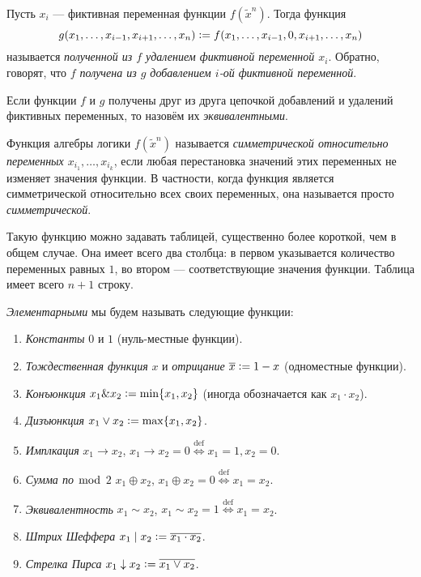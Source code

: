 \begin{definition}
    Пусть $x_i$ --- фиктивная переменная функции $f(\widetilde{x}^n)$. Тогда функция \[g(x_1, \ldots, x_{i - 1}, x_{i + 1}, \ldots, x_n) \vcentcolon = f(x_1, \ldots, x_{i - 1}, 0, x_{i + 1}, \ldots, x_n)\]
    называется \textit{полученной из $f$ удалением фиктивной переменной $x_i$}. Обратно, говорят, что \textit{$f$ получена из $g$ добавлением $i$-ой фиктивной переменной}.
\end{definition}

\begin{definition}
    Если функции $f$ и $g$ получены друг из друга цепочкой добавлений и удалений фиктивных переменных, то назовём их \textit{эквивалентными}.
\end{definition}

\begin{definition}
    Функция алгебры логики $f(\widetilde{x}^n)$ называется \textit{симметрической относительно переменных $x_{i_1}, \ldots, x_{i_k}$}, если любая перестановка значений этих переменных не изменяет значения функции. В частности, когда функция является симметрической относительно всех своих переменных, она называется просто \textit{симметрической}.
\end{definition}

Такую функцию можно задавать таблицей, существенно более короткой, чем в общем случае. Она имеет всего два столбца: в первом указывается количество переменных равных $1$, во втором --- соответствующие значения функции. Таблица имеет всего $n + 1$ строку.

\begin{definition}
    \textit{Элементарными} мы будем называть следующие функции:
    \begin{enumerate}[nolistsep]
        \item \textit{Константы} $0$ и $1$ (нуль-местные функции).
        \item \textit{Тождественная функция} $x$ и \textit{отрицание} $\overline{x} \vcentcolon = 1 - x$ (одноместные функции).
        \item \textit{Конъюнкция} $x_1 \& x_2 \vcentcolon = \min\{x_1, x_2\}$ (иногда обозначается как $x_1 \cdot x_2$).
        \item \textit{Дизъюнкция} $x_1 \vee x_2 \vcentcolon = \max\{x_1, x_2\}$.
        \item \textit{Имплкация} $x_1 \to x_2$, $x_1 \to x_2 = 0 \overset{\mathrm{def}}{\Longleftrightarrow} x_1 = 1, x_2 = 0$.
        \item \textit{Сумма по $\bmod$ $2$} $x_1 \oplus x_2$, $x_1 \oplus x_2 = 0 \overset{\mathrm{def}}{\Longleftrightarrow} x_1 = x_2$.
        \item \textit{Эквивалентность} $x_1 \sim x_2$, $x_1 \sim x_2 = 1 \overset{\mathrm{def}}{\Longleftrightarrow} x_1 = x_2$.
        \item \textit{Штрих Шеффера} $x_1 \mid x_2 \vcentcolon = \overline{x_1 \cdot x_2}$.
        \item \textit{Стрелка Пирса} $x_1 \downarrow x_2 \vcentcolon = \overline{x_1 \vee x_2}$.
    \end{enumerate}
\end{definition}


